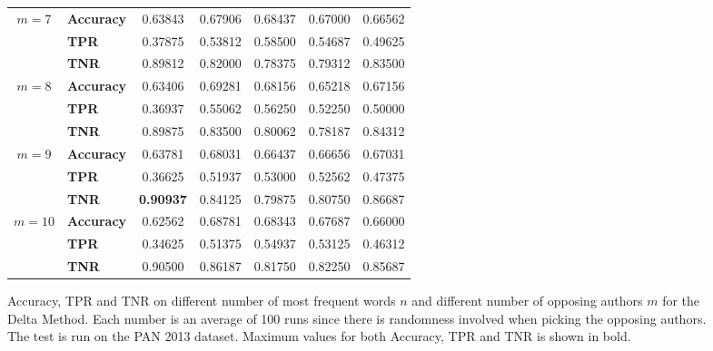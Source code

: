 \begin{figure}
\begin{tabular}{c|lccccc}
        \hline
        $m=7$  & \textbf{Accuracy} & 0.63843 & 0.67906 & 0.68437 & 0.67000 & 0.66562 \\
               & \textbf{TPR}      & 0.37875 & 0.53812 & 0.58500 & 0.54687 & 0.49625 \\
               & \textbf{TNR}      & 0.89812 & 0.82000 & 0.78375 & 0.79312 & 0.83500 \\
        \hline
        $m=8$  & \textbf{Accuracy} & 0.63406 & 0.69281 & 0.68156 & 0.65218 & 0.67156 \\
               & \textbf{TPR}      & 0.36937 & 0.55062 & 0.56250 & 0.52250 & 0.50000 \\
               & \textbf{TNR}      & 0.89875 & 0.83500 & 0.80062 & 0.78187 & 0.84312 \\
        \hline
        $m=9$  & \textbf{Accuracy} & 0.63781 & 0.68031 & 0.66437 & 0.66656 & 0.67031 \\
               & \textbf{TPR}      & 0.36625 & 0.51937 & 0.53000 & 0.52562 & 0.47375 \\
               & \textbf{TNR}      & \textbf{0.90937} & 0.84125 & 0.79875 & 0.80750 & 0.86687 \\
        \hline
        $m=10$ & \textbf{Accuracy} & 0.62562 & 0.68781 & 0.68343 & 0.67687 & 0.66000 \\
               & \textbf{TPR}      & 0.34625 & 0.51375 & 0.54937 & 0.53125 & 0.46312 \\
               & \textbf{TNR}      & 0.90500 & 0.86187 & 0.81750 & 0.82250 & 0.85687
    \end{tabular}
    \caption{Accuracy, \gls{TPR} and \gls{TNR} on different number of most
        frequent words $n$ and different number of opposing authors $m$ for the
        Delta Method. Each number is an average of 100 runs since there is
        randomness involved when picking the opposing authors. The test is run
        on the PAN 2013 dataset. Maximum values for both Accuracy, \gls{TPR} and
        \gls{TNR} is shown in bold.}
    \label{fig:delta_pan_2013_res}
\end{figure}






